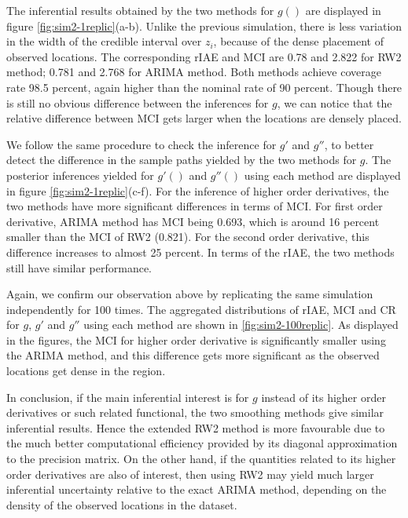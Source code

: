 \documentclass{article}
\begin{document}
The inferential results obtained by the two methods for $g()$ are displayed in figure \ref{fig:sim2-1replic}(a-b). Unlike the previous simulation, there is less variation in the width of the credible interval over $z_i$, because of the dense placement of observed locations. The corresponding rIAE and MCI are 0.78 and 2.822 for RW2 method; 0.781 and 2.768 for ARIMA method. Both methods achieve coverage rate 98.5 percent, again higher than the nominal rate of 90 percent. Though there is still no obvious difference between the inferences for $g$, we can notice that the relative difference between MCI gets larger when the locations are densely placed.

We follow the same procedure to check the inference for $g'$ and $g''$, to better detect the difference in the sample paths yielded by the two methods for $g$. The posterior inferences yielded for $g'()$ and $g''()$ using each method are displayed in figure \ref{fig:sim2-1replic}(c-f).
For the inference of higher order derivatives, the two methods have more significant differences in terms of MCI. For first order derivative, ARIMA method has MCI being 0.693, which is around 16 percent smaller than the MCI of RW2 (0.821). For the second order derivative, this difference increases to almost 25 percent. In terms of the rIAE, the two methods still have similar performance.

Again, we confirm our observation above by replicating the same simulation independently for 100 times. The aggregated distributions of rIAE, MCI and CR for $g$, $g'$ and $g''$ using each method are shown in \ref{fig:sim2-100replic}. As displayed in the figures, the MCI for higher order derivative is significantly smaller using the ARIMA method, and this difference gets more significant as the observed locations get dense in the region.

In conclusion, if the main inferential interest is for $g$ instead of its higher order derivatives or such related functional, the two smoothing methods give similar inferential results. Hence the extended RW2 method is more favourable due to the much better computational efficiency provided by its diagonal approximation to the precision matrix. On the other hand, if the quantities related to its higher order derivatives are also of interest, then using RW2 may yield much larger inferential uncertainty relative to the exact ARIMA method, depending on the density of the observed locations in the dataset. 
\end{document}
